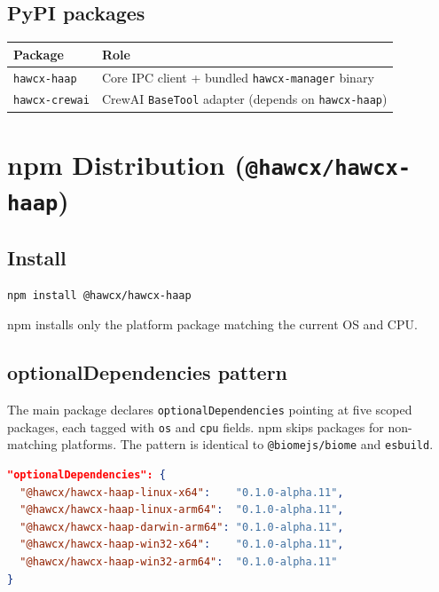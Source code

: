 \documentclass[11pt, a4paper]{article}
\newcommand{\pkg}[1]{\texttt{#1}}
\newcommand{\code}[1]{\texttt{#1}}
\begin{document}
\subsection{PyPI packages}

\begin{table}[h!]
\centering
\renewcommand{\arraystretch}{1.2}
\begin{tabular}{@{} l X @{}}
\toprule
\textbf{Package} & \textbf{Role} \\
\midrule
\pkg{hawcx-haap}   & Core IPC client + bundled \pkg{hawcx-manager} binary \\
\pkg{hawcx-crewai} & CrewAI \code{BaseTool} adapter (depends on \pkg{hawcx-haap}) \\
\bottomrule
\end{tabular}
\end{table}

\section{npm Distribution (\texttt{@hawcx/hawcx-haap})}

\subsection{Install}

\begin{lstlisting}[language=bash, numbers=none, frame=none, backgroundcolor=\color{codebg}]
npm install @hawcx/hawcx-haap
\end{lstlisting}

npm installs only the platform package matching the current OS and CPU.

\subsection{optionalDependencies pattern}

The main package declares \code{optionalDependencies} pointing at five scoped
packages, each tagged with \code{os} and \code{cpu} fields. npm skips packages
for non-matching platforms. The pattern is identical to \pkg{@biomejs/biome}
and \pkg{esbuild}.

\begin{lstlisting}[language=JSON, caption={node/package.json (optionalDependencies)}]
"optionalDependencies": {
  "@hawcx/hawcx-haap-linux-x64":    "0.1.0-alpha.11",
  "@hawcx/hawcx-haap-linux-arm64":  "0.1.0-alpha.11",
  "@hawcx/hawcx-haap-darwin-arm64": "0.1.0-alpha.11",
  "@hawcx/hawcx-haap-win32-x64":    "0.1.0-alpha.11",
  "@hawcx/hawcx-haap-win32-arm64":  "0.1.0-alpha.11"
}
\end{lstlisting}
\end{document}

